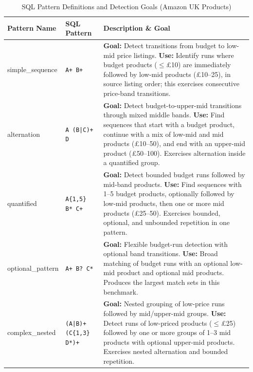 \documentclass[preprint,12pt,times,a4paper]{elsarticle}
\begin{document}
{\small
\setlength{\LTleft}{0pt}
\setlength{\LTright}{0pt}
\begin{table}[!tbp]
\centering\footnotesize

\begin{tabularx}{\textwidth}{@{}ll>{\raggedright\arraybackslash}X@{}}
\toprule
\textbf{Pattern Name} & \textbf{SQL Pattern} & \textbf{Description \& Goal} \\
\midrule


simple\_sequence & \texttt{A+ B+} &
\textbf{Goal:} Detect transitions from budget to low-mid price listings. \newline
\textbf{Use:} Identify runs where budget products (${\le}$\pounds10) are immediately followed by low-mid products (\pounds10--25), in source listing order; this exercises consecutive price-band transitions. \\
\midrule

alternation & \texttt{A (B|C)+ D} &
\textbf{Goal:} Detect budget-to-upper-mid transitions through mixed middle bands. \newline
\textbf{Use:} Find sequences that start with a budget product, continue with a mix of low-mid and mid products (\pounds10--50), and end with an upper-mid product (\pounds50--100). Exercises alternation inside a quantified group. \\
\midrule

quantified & \texttt{A\{1,5\} B* C+} &
\textbf{Goal:} Detect bounded budget runs followed by mid-band products. \newline
\textbf{Use:} Find sequences with 1--5 budget products, optionally followed by low-mid products, then one or more mid products (\pounds25--50). Exercises bounded, optional, and unbounded repetition in one pattern. \\
\midrule

optional\_pattern & \texttt{A+ B? C*} &
\textbf{Goal:} Flexible budget-run detection with optional band transitions. \newline
\textbf{Use:} Broad matching of budget runs with an optional low-mid product and optional mid products. Produces the largest match sets in this benchmark. \\
\midrule

complex\_nested & \texttt{(A|B)+ (C\{1,3\} D*)+} &
\textbf{Goal:} Nested grouping of low-price runs followed by mid/upper-mid groups. \newline
\textbf{Use:} Detect runs of low-priced products (${\le}$\pounds25) followed by one or more groups of 1--3 mid products with optional upper-mid products. Exercises nested alternation and bounded repetition. \\
\bottomrule
\end{tabularx}
\caption{SQL Pattern Definitions and Detection Goals (Amazon UK Products)}
\label{tab:pattern_definitions}
\end{table}
}
\end{document}
